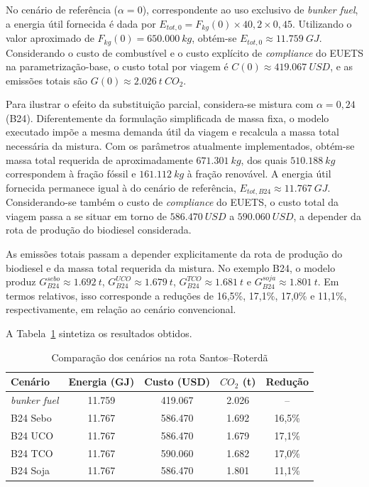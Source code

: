 No cenário de referência ($\alpha = 0$), correspondente ao uso exclusivo de \emph{bunker fuel}, a energia útil fornecida é dada por $E_{tot,0} = F_{kg}(0)\times 40,2 \times 0,45$. Utilizando o valor aproximado de $F_{kg}(0)=650.000~kg$, obtém-se $E_{tot,0} \approx 11.759~GJ$. Considerando o custo de combustível e o custo explícito de \emph{compliance} do \gls{EUETS} na parametrização-base, o custo total por viagem é $C(0) \approx 419.067~USD$, e as emissões totais são $G(0) \approx 2.026~t~CO_2$.

Para ilustrar o efeito da substituição parcial, considera-se mistura com $\alpha = 0,24$ (\gls{B24}). Diferentemente da formulação simplificada de massa fixa, o modelo executado impõe a mesma demanda útil da viagem e recalcula a massa total necessária da mistura. Com os parâmetros atualmente implementados, obtém-se massa total requerida de aproximadamente $671.301~kg$, dos quais $510.188~kg$ correspondem à fração fóssil e $161.112~kg$ à fração renovável. A energia útil fornecida permanece igual à do cenário de referência, $E_{tot,B24} \approx 11.767~GJ$. Considerando-se também o custo de \emph{compliance} do \gls{EUETS}, o custo total da viagem passa a se situar em torno de $586.470~USD$ a $590.060~USD$, a depender da rota de produção do biodiesel considerada.

As emissões totais passam a depender explicitamente da rota de produção do biodiesel e da massa total requerida da mistura. No exemplo B24, o modelo produz $G_{B24}^{sebo} \approx 1.692~t$, $G_{B24}^{UCO} \approx 1.679~t$, $G_{B24}^{TCO} \approx 1.681~t$ e $G_{B24}^{soja} \approx 1.801~t$. Em termos relativos, isso corresponde a reduções de 16,5\%, 17,1\%, 17,0\% e 11,1\%, respectivamente, em relação ao cenário convencional.

A Tabela~\ref{tab:toy_santos_rotterdam} sintetiza os resultados obtidos.

\begin{table}[!ht]
\centering
\caption{Comparação dos cenários na rota Santos--Roterdã}
\label{tab:toy_santos_rotterdam}
\begin{tabular}{lcccc}
\hline
Cenário & Energia (GJ) & Custo (USD) & $CO_2$ (t) & Redução \\
\hline
\emph{bunker fuel} & 11.759 & 419.067 & 2.026 & -- \\
B24 Sebo & 11.767 & 586.470 & 1.692 & 16,5\% \\
B24 UCO & 11.767 & 586.470 & 1.679 & 17,1\% \\
B24 TCO & 11.767 & 590.060 & 1.682 & 17,0\% \\
B24 Soja & 11.767 & 586.470 & 1.801 & 11,1\% \\
\hline
\end{tabular}
\end{table}

